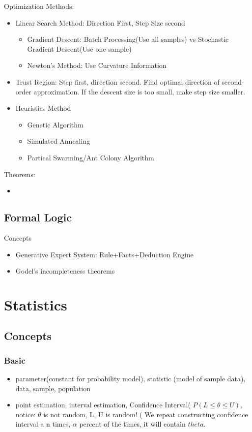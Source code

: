 \documentclass[11pt, openany]{book}              %
\begin{document}
Optimization Methods:
\begin{itemize}
    \item Linear Search Method: Direction First, Step Size second	
    	\begin{itemize}  		
    		\item Gradient Descent: Batch Processing(Use all samples) vs Stochastic Gradient Descent(Use one sample)
    		\item Newton's Method: Use Curvature Information 
   		\end{itemize}
   	\item Trust Region: Step first, direction second. Find optimal direction of second-order approximation. If the descent size is too small, make step size smaller.
   	\item Heuristics Method
   		\begin{itemize}  		
	    	\item Genetic Algorithm
	 	   	\item Simulated Annealing 
	    	\item Partical Swarming/Ant Colony Algorithm
	    \end{itemize}
\end{itemize}

Theorems:

\begin{itemize}
	\item
\end{itemize}


\section{Formal Logic}

Concepts
\begin{itemize}
    \item Generative Expert System: Rule+Facts+Deduction Engine 
    \item Godel's incompleteness theorems
\end{itemize}

\chapter{Statistics}

\section{Concepts}
\subsection{Basic}
\begin{itemize}
    \item parameter(constant for probability model), statistic (model of sample data), data, sample, population
    \item point estimation, interval estimation, Confidence Interval( $P(L \leq \theta \leq U )$, notice: $\theta$ is not random, L, U is random! ( We repeat constructing confidence interval a n times, $\alpha$ percent of the times, it will contain $theta$.
\end{itemize}
\end{document}
